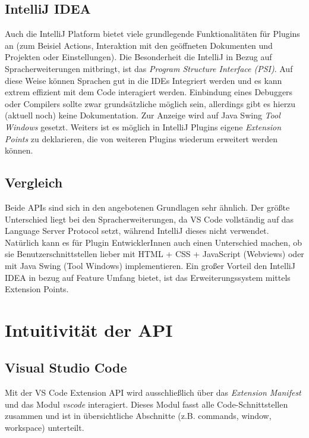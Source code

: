 \subsection{IntelliJ IDEA}

Auch die IntelliJ Platform bietet viele grundlegende Funktionalitäten
für Plugins an (zum Beisiel Actions, Interaktion mit den geöffneten Dokumenten
und Projekten oder Einstellungen). Die Besonderheit die IntelliJ
in Bezug auf Spracherweiterungen
mitbringt, ist das \emph{Program Structure Interface (PSI)}. 
Auf diese Weise können Sprachen gut in die IDEs Integriert werden
und es kann extrem effizient mit dem Code interagiert werden.
Einbindung eines Debuggers oder Compilers sollte zwar grundsätzliche
möglich sein, allerdings gibt es hierzu (aktuell noch) keine Dokumentation.
Zur Anzeige wird auf Java Swing \emph{Tool Windows} gesetzt.
Weiters ist es möglich in IntelliJ Plugins eigene 
\emph{Extension Points} zu deklarieren, die von weiteren Plugins
wiederum erweitert werden können.

\subsection{Vergleich}

Beide APIs sind sich in den angebotenen Grundlagen sehr ähnlich.
Der größte Unterschied liegt bei den Spracherweiterungen, da VS Code 
vollständig auf das Language Server Protocol setzt, während IntelliJ
dieses nicht verwendet. Natürlich kann es für Plugin EntwicklerInnen
auch einen Unterschied machen, ob sie Benutzerschnittstellen
lieber mit HTML + CSS + JavaScript (Webviews) oder
mit Java Swing (Tool Windows) implementieren. 
Ein großer Vorteil den IntelliJ IDEA in bezug auf Feature Umfang
bietet, ist das Erweiterungssystem mittels Extension Points.


\section{Intuitivität der API}
\label{sec:Vergleich_Intuitivität}

\subsection{Visual Studio Code}

Mit der VS Code Extension API wird ausschließlich
über das \emph{Extension Manifest} und das Modul \emph{vscode} interagiert.
Dieses Modul fasst alle Code-Schnittstellen zusammen und ist
in übersichtliche Abschnitte (z.B. commands, window, workspace) unterteilt.

